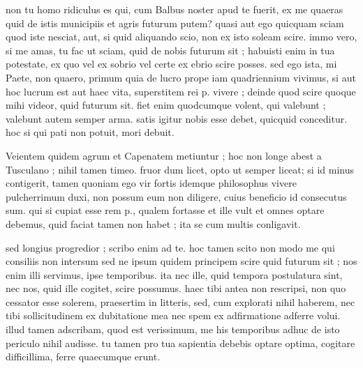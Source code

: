 


 non tu homo ridiculus es qui, cum Balbus noster apud te fuerit, ex me quaeras quid de istis municipiis et agris futurum putem? quasi aut ego quicquam sciam quod iste nesciat, aut, si quid aliquando scio, non ex isto soleam scire. immo vero, si me amas, tu fac ut sciam, quid de nobis futurum sit ; habuisti enim in tua potestate, ex quo vel ex sobrio vel certe ex ebrio scire posses. sed ego ista, mi Paete, non quaero, primum quia de lucro prope iam quadriennium vivimus, si aut hoc lucrum est aut haec vita, superstitem rei p. vivere ; deinde quod scire quoque mihi videor, quid futurum sit. fiet enim quodcumque volent, qui valebunt ; valebunt autem semper arma. satis igitur nobis esse debet, quicquid conceditur. hoc si qui pati non potuit, mori debuit.

 Veientem quidem agrum et Capenatem metiuntur ; hoc non longe abest a Tusculano ; nihil tamen timeo. fruor dum licet, opto ut semper liceat; si id minus contigerit, tamen quoniam ego vir fortis idemque philosophus vivere pulcherrimum duxi, non possum eum non diligere, cuius beneficio id consecutus sum. qui si cupiat esse rem p., qualem fortasse et ille vult et omnes optare debemus, quid faciat tamen non habet ; ita se cum multis conligavit.

 sed longius progredior ; scribo enim ad te. hoc tamen scito non modo me qui consiliis non intersum sed ne ipsum quidem principem scire quid futurum sit ; nos enim illi servimus, ipse temporibus. ita nec ille, quid tempora postulatura sint, nec nos, quid ille cogitet, scire possumus. haec tibi antea non rescripsi, non quo cessator esse solerem, praesertim in litteris, sed, cum explorati nihil haberem, nec tibi sollicitudinem ex dubitatione mea nec spem ex adfirmatione adferre volui. illud tamen adscribam, quod est verissimum, me his temporibus adhuc de isto periculo nihil audisse. tu tamen pro tua sapientia debebis optare optima, cogitare difficillima, ferre quaecumque erunt.
